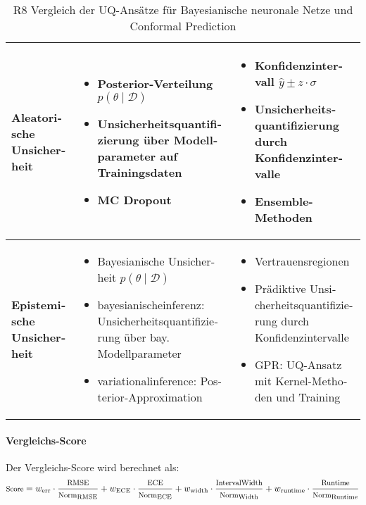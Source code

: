 \begin{otherlanguage}{ngerman}
\begin{table}[!htpb]
\begin{tabularx}{\textwidth}{|l|X|X|}
    \textbf{\gls{Aleatorische Unsicherheit}} &
    \begin{itemize}
      \item Posterior-Verteilung \( p(\theta \mid \mathcal{D}) \)
      \item Unsicherheitsquantifizierung über Modellparameter auf Trainingsdaten
      \item MC Dropout
    \end{itemize}
    &
    \begin{itemize}
      \item Konfidenzintervall \( \hat{y} \pm z \cdot \sigma \)
      \item Unsicherheitsquantifizierung durch Konfidenzintervalle
      \item Ensemble-Methoden
    \end{itemize}
    \\
    \hline

    \textbf{\gls{Epistemische Unsicherheit}} &
    \begin{itemize}
      \item Bayesianische Unsicherheit \( p(\theta \mid \mathcal{D}) \)
      \item \gls{bayesianischeinferenz}: Unsicherheitsquantifizierung über bay. Modellparameter
      \item \gls{variationalinference}: Posterior-Approximation
    \end{itemize}
    &
    \begin{itemize}
      \item Vertrauensregionen
      \item Prädiktive Unsicherheitsquantifizierung durch Konfidenzintervalle
      \item GPR: UQ-Ansatz mit Kernel-Methoden und Training
    \end{itemize}
    \\
    \hline

  \end{tabularx}
  \caption{R8 Vergleich der UQ-Ansätze für \gls{Bayesianische neuronale Netze} und \gls{Conformal Prediction}}
  \label{tab:chapter6r81}
\end{table}




\paragraph{Vergleichs-Score}

Der Vergleichs-Score wird berechnet als:
{
  \[\footnotesize
  \text{Score} = w_\text{err} \cdot \frac{\text{RMSE}}{\text{Norm}_\text{RMSE}}
  + w_\text{ECE} \cdot \frac{\text{ECE}}{\text{Norm}_\text{ECE}}
  + w_\text{width} \cdot \frac{\text{IntervalWidth}}{\text{Norm}_\text{Width}}
  + w_\text{runtime} \cdot \frac{\text{Runtime}}{\text{Norm}_\text{Runtime}}
  \]
}


\end{otherlanguage}
